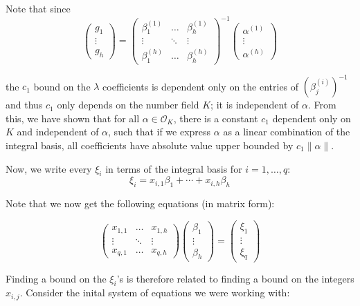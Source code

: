 \documentclass[a4paper, 11pt]{book}
\begin{document}
{Note that since 
\[
    \begin{pmatrix}
        g_1 \\ \vdots \\ g_h
    \end{pmatrix} =
    {\begin{pmatrix}
        {\beta}^{(1)}_1 & \hdots & {\beta}^{(1)}_h \\
        \vdots & \ddots & \vdots \\
        {\beta}^{(h)}_1 & \hdots & {\beta}^{(h)}_h
    \end{pmatrix}
}^{-1}
    \begin{pmatrix}
        {\alpha}^{(1)} \\ \vdots \\ {\alpha}^{(h)}
    \end{pmatrix}
\]

the $c_1$ bound on the $\lambda$ coefficients is dependent only on the entries of ${\left(\beta^{(i)}_j\right)}^{-1}$ and thus $c_1$ only depends on the number field $K$; it is independent of $\alpha$. From this, we have shown that for all $\alpha \in \mathcal{O}_K$, there is a constant $c_1$ dependent only on $K$ and independent of $\alpha$, such that if we express $\alpha$ as a linear combination of the integral basis, all coefficients have absolute value upper bounded by $c_1 \| \alpha \|$.

Now, we write every $\xi_i$ in terms of the integral basis for $i = 1, \ldots, q$:
\[ \xi_i = x_{i,1}\beta_1 + \cdots + x_{i,h}\beta_{h} \]

Note that we now get the following equations (in matrix form):

\[\begin{pmatrix}
    x_{1,1} & \hdots & x_{1,h} \\
    \vdots & \ddots & \vdots \\
    x_{q,1} & \hdots & x_{q,h} 
\end{pmatrix} 
\begin{pmatrix}
    \beta_1 \\ \vdots \\ \beta_h
\end{pmatrix} = 
\begin{pmatrix}
    \xi_1 \\ \vdots \\ \xi_q 
\end{pmatrix}
\]

 Finding a bound on the $\xi_i$'s is therefore related to finding a bound on the integers $x_{i,j}$. Consider the inital system of equations we were working with:

}
\end{document}
